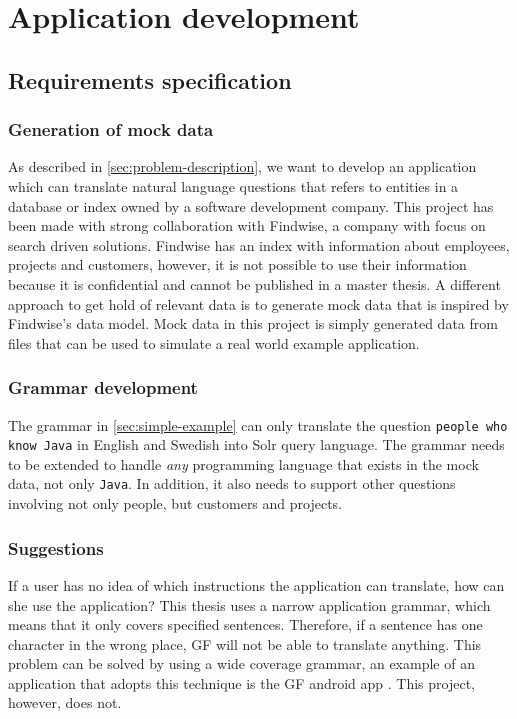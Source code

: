 \chapter{Application development}\label{ch:application-overview}

\section{Requirements specification}

\subsection{Generation of mock data}
As described in \autoref{sec:problem-description}, we want to develop an application which can translate natural language questions that refers to entities in a database or index owned by a software development company. This project has been made with strong collaboration with Findwise, a company with focus on search driven solutions. Findwise has an index with information about employees, projects and customers, however, it is not possible to use their information because it is confidential and cannot be published in a master thesis. A different approach to get hold of relevant data is to generate mock data that is inspired by Findwise's data model. Mock data in this project is simply generated data from files that can be used to simulate a real world example application.

\subsection{Grammar development}
The grammar in \autoref{sec:simple-example} can only translate the question \texttt{people who know Java} in English and Swedish into Solr query language. The grammar needs to be extended to handle \emph{any} programming language that exists in the mock data, not only \texttt{Java}. In addition, it also needs to support other questions involving not only people, but customers and projects.

\subsection{Suggestions}\label{sec:suggestions}
If a user has no idea of which instructions the application can translate, how can she use the application? This thesis uses a narrow application grammar, which means that it only covers specified sentences. Therefore, if a sentence has one character in the wrong place, GF will not be able to
translate anything. This problem can be solved by using a wide coverage grammar, an example of an application that adopts this technique is the GF android app \cite[p. 41]{angelov2014speech}. This project, however, does not.

